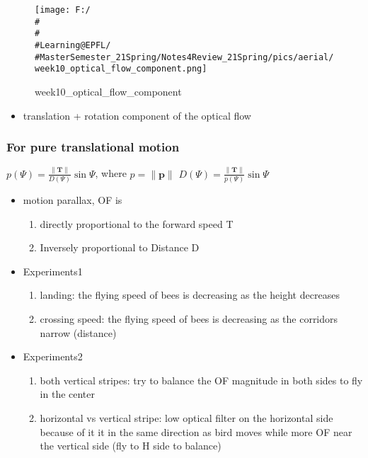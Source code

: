 \documentclass[]{article}
\begin{document}
\begin{figure}
\centering
\texttt{[image: F:/\\\#\\\#\\\#Learning@EPFL/\\\#MasterSemester\_21Spring/Notes4Review\_21Spring/pics/aerial/week10\_optical\_flow\_component.png]}
\caption{week10\_optical\_flow\_component}
\end{figure}

\begin{itemize}
\item
  translation + rotation component of the optical flow
\end{itemize}

\subsubsection{For pure translational motion}\label{header-n2357}

\(p(\Psi)=\frac{\|\mathbf{T}\|}{D(\Psi)} \sin \Psi\), where
\(p=\|\mathbf{p}\|\)
\(D(\Psi)=\frac{\|\mathbf{T}\|}{p(\Psi)} \sin \Psi\)

\begin{itemize}
\item
  motion parallax, OF is

  \begin{enumerate}
  \def\labelenumi{\arabic{enumi}.}
  \item
    directly proportional to the forward speed T
  \item
    Inversely proportional to Distance D
  \end{enumerate}
\item
  Experiments1

  \begin{enumerate}
  \def\labelenumi{\arabic{enumi}.}
  \item
    landing: the flying speed of bees is decreasing as the height
    decreases
  \item
    crossing speed: the flying speed of bees is decreasing as the
    corridors narrow (distance)
  \end{enumerate}
\item
  Experiments2

  \begin{enumerate}
  \def\labelenumi{\arabic{enumi}.}
  \item
    both vertical stripes: try to balance the OF magnitude in both sides
    to fly in the center
  \item
    horizontal vs vertical stripe: low optical filter on the horizontal
    side because of it it in the same direction as bird moves while more
    OF near the vertical side (fly to H side to balance)
  \end{enumerate}
\end{itemize}
\end{document}
